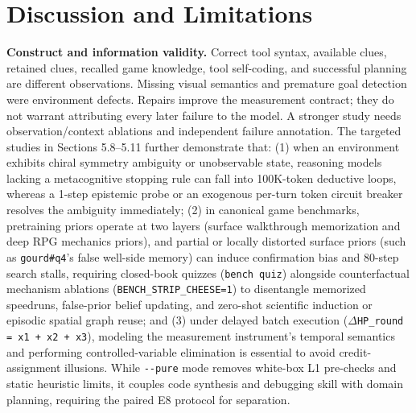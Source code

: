 \documentclass[11pt,a4paper]{article}
\begin{document}
\section{\texorpdfstring{Discussion and Limitations}{Discussion and Limitations}}

\textbf{Construct and information validity.} Correct tool syntax, available clues, retained clues, recalled game knowledge, tool self-coding, and successful planning are different observations. Missing visual semantics and premature goal detection were environment defects. Repairs improve the measurement contract; they do not warrant attributing every later failure to the model. A stronger study needs observation/context ablations and independent failure annotation. The targeted studies in Sections 5.8--5.11 further demonstrate that: (1) when an environment exhibits chiral symmetry ambiguity or unobservable state, reasoning models lacking a metacognitive stopping rule can fall into 100K-token deductive loops, whereas a 1-step epistemic probe or an exogenous per-turn token circuit breaker resolves the ambiguity immediately; (2) in canonical game benchmarks, pretraining priors operate at two layers (surface walkthrough memorization and deep RPG mechanics priors), and partial or locally distorted surface priors (such as \texttt{gourd\#q4}'s false well-side memory) can induce confirmation bias and 80-step search stalls, requiring closed-book quizzes (\texttt{bench\allowbreak{} \allowbreak{}quiz}) alongside counterfactual mechanism ablations (\texttt{BENCH\allowbreak{}\_\allowbreak{}STRIP\allowbreak{}\_\allowbreak{}CHEESE\allowbreak{}=\allowbreak{}1}) to disentangle memorized speedruns, false-prior belief updating, and zero-shot scientific induction or episodic spatial graph reuse; and (3) under delayed batch execution (\texttt{\ensuremath{\Delta}HP\allowbreak{}\_\allowbreak{}round\allowbreak{} \allowbreak{}=\allowbreak{} \allowbreak{}x1\allowbreak{} \allowbreak{}+\allowbreak{} \allowbreak{}x2\allowbreak{} \allowbreak{}+\allowbreak{} \allowbreak{}x3}), modeling the measurement instrument's temporal semantics and performing controlled-variable elimination is essential to avoid credit-assignment illusions. While \texttt{-\allowbreak{}-\allowbreak{}pure} mode removes white-box L1 pre-checks and static heuristic limits, it couples code synthesis and debugging skill with domain planning, requiring the paired E8 protocol for separation.
\end{document}
